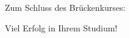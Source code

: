 \documentclass[german]{beamer}
\begin{document}

\begin{frame}{Zum Schluss des Br\"uckenkurses:}

\begin{center}
{\huge
Viel Erfolg in Ihrem Studium!
}
\end{center}

\end{frame}

\begin{frame}

\end{frame}
\end{document}
